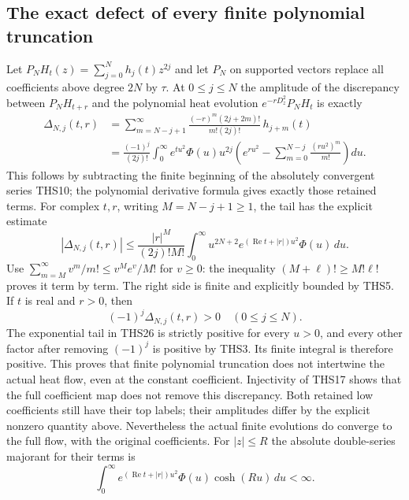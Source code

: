 \subsection{The exact defect of every finite polynomial truncation}
Let $P_NH_t(z)=\sum_{j=0}^Nh_j(t)z^{2j}$ and let $P_N$ on
supported vectors replace all coefficients above degree $2N$
by $\tau$. At $0\le j\le N$ the amplitude of the discrepancy
between $P_NH_{t+r}$ and the polynomial heat evolution
$e^{-rD_z^2}P_NH_t$ is exactly
\begin{equation}\tag{THS26}
\begin{split}
 \Delta_{N,j}(t,r)
 &=\sum_{m=N-j+1}^{\infty}
       \frac{(-r)^m(2j+2m)!}{m!(2j)!}\,h_{j+m}(t)\\
 &=\frac{(-1)^j}{(2j)!}\int_0^\infty e^{tu^2}\Phi(u)u^{2j}
   \left(e^{ru^2}-\sum_{m=0}^{N-j}\frac{(ru^2)^m}{m!}\right)du.
\end{split}
\end{equation}
This follows by subtracting the finite beginning of the absolutely
convergent series THS10; the polynomial derivative formula gives
exactly those retained terms. For complex $t,r$, writing
$M=N-j+1\ge1$, the tail has the explicit estimate
\begin{equation}\tag{THS27}
 |\Delta_{N,j}(t,r)|
 \le\frac{|r|^M}{(2j)!M!}
      \int_0^\infty u^{2N+2}
          e^{(\operatorname{Re}t+|r|)u^2}\Phi(u)\,du.
\end{equation}
Use $\sum_{m=M}^{\infty}v^m/m!\le v^Me^v/M!$ for $v\ge0$:
the inequality $(M+\ell)!\ge M!\ell!$ proves it term by term.
The right side is finite and explicitly bounded by THS5.
If $t$ is real and $r>0$, then
\begin{equation}\tag{THS28}
             (-1)^j\Delta_{N,j}(t,r)>0
             \quad(0\le j\le N).
\end{equation}
The exponential tail in THS26 is strictly positive for every
$u>0$, and every other factor after removing $(-1)^j$ is
positive by THS3. Its finite integral is therefore positive.
This proves that finite polynomial truncation does not
intertwine the actual heat flow, even at the constant coefficient.
Injectivity of THS17 shows that the full coefficient map does
not remove this discrepancy. Both retained low coefficients
still have their top labels; their amplitudes differ by the
explicit nonzero quantity above.
Nevertheless the actual finite evolutions do converge to the
full flow, with the original coefficients. For $|z|\le R$ the
absolute double-series majorant for their terms is
\begin{equation}\tag{THS29}
 \int_0^\infty
 e^{(\operatorname{Re}t+|r|)u^2}\Phi(u)\cosh(Ru)\,du<\infty.
\end{equation}
